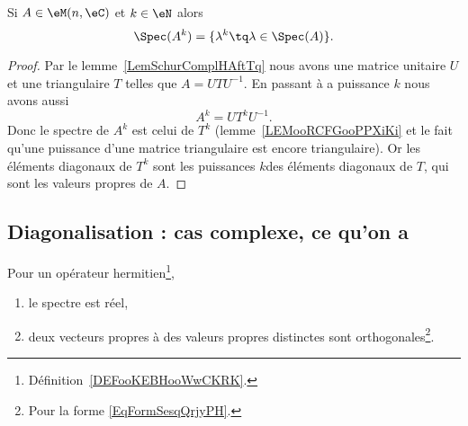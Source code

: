 \begin{corollary}       \label{CORooTPDHooXazTuZ}
    Si \( A\in \eM(n,\eC)\) et \( k\in \eN\) alors
    \begin{equation}
        \Spec(A^k)=\{ \lambda^k\tq \lambda\in \Spec(A) \}.
    \end{equation}
\end{corollary}

\begin{proof}
    Par le lemme~\ref{LemSchurComplHAftTq} nous avons une matrice unitaire \( U\) et une triangulaire \( T\) telles que \( A=UTU^{-1}\). En passant à a puissance \( k\) nous avons aussi
    \begin{equation}
        A^k=UT^kU^{-1}.
    \end{equation}
    Donc le spectre de \( A^k\) est celui de \( T^k\) (lemme~\ref{LEMooRCFGooPPXiKi} et le fait qu'une puissance d'une matrice triangulaire est encore triangulaire). Or les éléments diagonaux de \( T^k\) sont les puissances \( k\)\ieme des éléments diagonaux de \( T\), qui sont les valeurs propres de \( A\).
\end{proof}

\subsection{Diagonalisation : cas complexe, ce qu'on a}

\begin{lemma}      \label{LEMooVCEOooIXnTpp}
    Pour un opérateur hermitien\footnote{Définition~\ref{DEFooKEBHooWwCKRK}.},
    \begin{enumerate}
        \item
            le spectre est réel,
        \item
            deux vecteurs propres à des valeurs propres distinctes sont orthogonales\footnote{Pour la forme \eqref{EqFormSesqQrjyPH}.}.
    \end{enumerate}
\end{lemma}

